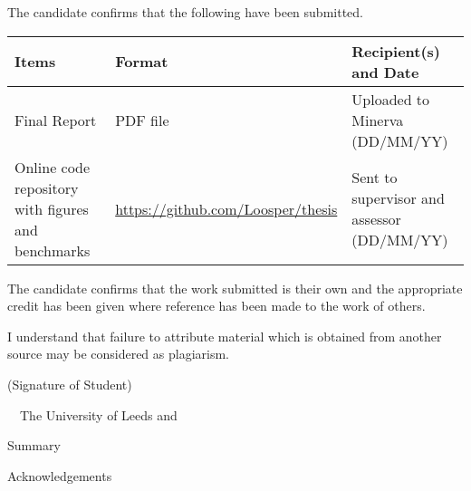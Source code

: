 \frontcover

\clearpage

\noindent The candidate confirms that the following have been submitted.\\


\begin{table}[ht!]
\begin{tabular}{|p{}|p{}|p{}|}
\hline
    Items & Format & Recipient(s) and Date \\
\hline
    Final Report & PDF file & Uploaded to Minerva (DD/MM/YY) \\
\hline
    Online code repository with figures and benchmarks &
    \url{https://github.com/Loosper/thesis} &
    Sent to supervisor and assessor (DD/MM/YY) \\
\hline
\end{tabular}
\end{table}


\vfill

\noindent The candidate confirms that the work submitted is their own and the appropriate credit has been given where reference has been made to the work of others.

\vfill

\noindent I understand that failure to attribute material which is obtained from another source may be considered as plagiarism.

\vfill

\begin{flushright}
    (Signature of Student) \fullname
\end{flushright}

\vfill

\textcopyright~\session~The University of Leeds and~\fullname

\setlength{\parindent}{11pt}

\begin{metachapter}{Summary}

\end{metachapter}

\begin{metachapter}{Acknowledgements}
    
\end{metachapter}

\tableofcontents

\listoffigures

\clearpage
{}
